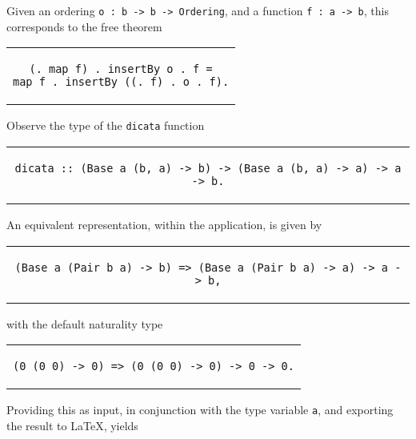 \documentclass[../Dissertation.tex]{subfiles}
\begin{document}
\noindent
Given an ordering \lstinline{o : b -> b -> Ordering}, and a function \lstinline{f : a -> b}, this corresponds to the free theorem
\begin{center}
\begin{tabular}{c}
\begin{lstlisting}
(. map f) . insertBy o . f =
map f . insertBy ((. f) . o . f).
\end{lstlisting}
\end{tabular}
\end{center}
Observe the type of the \lstinline{dicata} function
\begin{center}
\begin{tabular}{c}
\begin{lstlisting}[basicstyle=\footnotesize\ttfamily,style=haskellStyle]
dicata :: (Base a (b, a) -> b) -> (Base a (b, a) -> a) -> a -> b.
\end{lstlisting}
\end{tabular}
\end{center}
An equivalent representation, within the application, is given by
\begin{center}
\begin{tabular}{c}
\begin{lstlisting}[basicstyle=\footnotesize\ttfamily,style=haskellStyle]
(Base a (Pair b a) -> b) => (Base a (Pair b a) -> a) -> a -> b,
\end{lstlisting}
\end{tabular}
\end{center}
with the default naturality type
\begin{center}
\begin{tabular}{c}
\begin{lstlisting}
(0 (0 0) -> 0) => (0 (0 0) -> 0) -> 0 -> 0.
\end{lstlisting}
\end{tabular}
\end{center}
Providing this as input, in conjunction with the type variable \lstinline{a}, and exporting the result to LaTeX, yields
\end{document}
